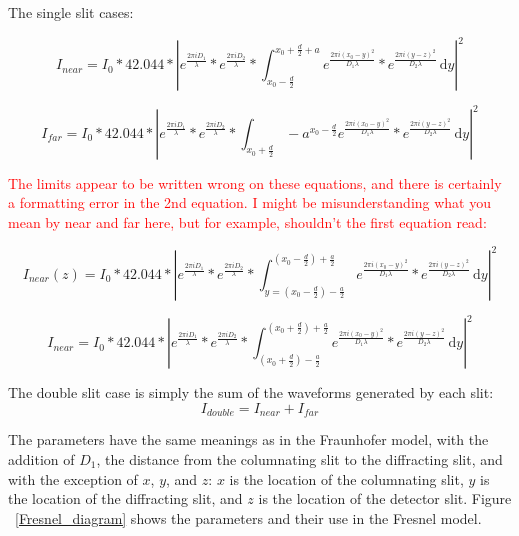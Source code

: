 \documentclass[prb,preprint]{revtex4-1}
\begin{document}
{The single slit cases:

\begin{equation}
I_{near}=I_{0}*42.044*|e^{\frac{2 \pi i D_{1}}{\lambda}}*e^{\frac{2 \pi i D_{2}}{\lambda}}*\int_{x_{0}-\frac{d}{2}}^{x_{0}+\frac{d}{2}+a} \! e^{\frac{2 \pi i (x_{0}-y)^{2}}{D_{1} \lambda}}*e^{\frac{2 \pi i (y-z)^{2}}{D_{2} \lambda}} \, \mathrm{d}y |^{2}
\end{equation}





\begin{equation}
I_{far}=I_{0}*42.044*|e^{\frac{2 \pi i D_{1}}{\lambda}}*e^{\frac{2 \pi i D_{2}}{\lambda}}*\int_{x_{0}+\frac{d}{2}}-a^{x_{0}-\frac{d}{2}} \! e^{\frac{2 \pi i (x_{0}-y)^{2}}{D_{1} \lambda}}*e^{\frac{2 \pi i (y-z)^{2}}{D_{2} \lambda}} \, \mathrm{d}y |^{2}
\end{equation}

\textcolor{red}{The limits appear to be written wrong on these equations, and there is certainly a formatting error in the 2nd equation.  I might be misunderstanding what you mean by near and far here, but for example,  shouldn't the first equation read: }

\begin{equation*}
I_{near}(z)=I_{0}*42.044*|e^{\frac{2 \pi i D_{1}}{\lambda}}*e^{\frac{2 \pi i D_{2}}{\lambda}}*\int_{y = \left(x_{0}-\frac{d}{2}\right) - \frac{a}{2}}^{\left(x_{0}-\frac{d}{2}\right) + \frac{a}{2}} \! e^{\frac{2 \pi i (x_{0}-y)^{2}}{D_{1} \lambda}}*e^{\frac{2 \pi i (y-z)^{2}}{D_{2} \lambda}} \, \mathrm{d}y |^{2}
\end{equation*}


\begin{equation*}
I_{near}=I_{0}*42.044*|e^{\frac{2 \pi i D_{1}}{\lambda}}*e^{\frac{2 \pi i D_{2}}{\lambda}}*\int_{\left(x_{0}+\frac{d}{2}\right) - \frac{a}{2}}^{\left(x_{0}+\frac{d}{2}\right) + \frac{a}{2}} \! e^{\frac{2 \pi i (x_{0}-y)^{2}}{D_{1} \lambda}}*e^{\frac{2 \pi i (y-z)^{2}}{D_{2} \lambda}} \, \mathrm{d}y |^{2}
\end{equation*}

The double slit case is simply the sum of the waveforms generated by each slit: 
\begin{equation}
I_{double}=I_{near}+I_{far}
\end{equation}

The parameters have the same meanings as in the Fraunhofer model, with the addition of $D_1$, the distance from the columnating slit to the diffracting slit, and with the exception of $x$, $y$, and $z$: $x$ is the location of the columnating slit, $y$ is the location of the diffracting slit, and $z$ is the location of the detector slit.  Figure ~\ref{Fresnel_diagram} shows the parameters and their use in the Fresnel model.  

}
\end{document}

